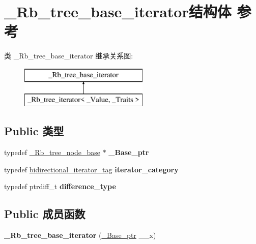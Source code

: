 \hypertarget{struct___rb__tree__base__iterator}{}\section{\+\_\+\+Rb\+\_\+tree\+\_\+base\+\_\+iterator结构体 参考}
\label{struct___rb__tree__base__iterator}
类 \+\_\+\+Rb\+\_\+tree\+\_\+base\+\_\+iterator 继承关系图\+:\begin{figure}[H]
\begin{center}
\leavevmode
\includegraphics[height=2.000000cm]{struct___rb__tree__base__iterator}
\end{center}
\end{figure}
\subsection*{Public 类型}
\begin{DoxyCompactItemize}
\item 
\mbox{\label{struct___rb__tree__base__iterator_a1ea271352e85bc8ce37304513a4331b4}} 
typedef \hyperlink{struct___rb__tree__node__base}{\+\_\+\+Rb\+\_\+tree\+\_\+node\+\_\+base} $\ast$ {\bfseries \+\_\+\+Base\+\_\+ptr}
\item 
\mbox{\label{struct___rb__tree__base__iterator_a94a89690ed13d00088e6db4f72c6331e}} 
typedef \hyperlink{structbidirectional__iterator__tag}{bidirectional\+\_\+iterator\+\_\+tag} {\bfseries iterator\+\_\+category}
\item 
\mbox{\label{struct___rb__tree__base__iterator_a2cedae5655a8fe330a2f8032c70f747a}} 
typedef ptrdiff\+\_\+t {\bfseries difference\+\_\+type}
\end{DoxyCompactItemize}
\subsection*{Public 成员函数}
\begin{DoxyCompactItemize}
\item 
\mbox{\label{struct___rb__tree__base__iterator_ac78c9bdacbfe23ccd3dcf93e272e505a}} 
{\bfseries \+\_\+\+Rb\+\_\+tree\+\_\+base\+\_\+iterator} (\hyperlink{struct___rb__tree__node__base}{\+\_\+\+Base\+\_\+ptr} \+\_\+\+\_\+x)
\end{DoxyCompactItemize}
